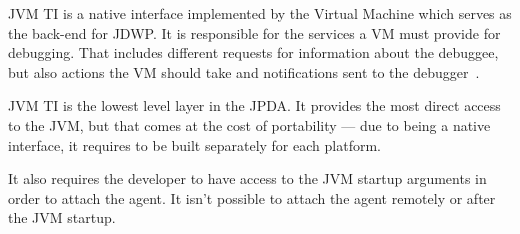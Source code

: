 \documentclass[..thesis.tex]{subfiles}
\begin{document}
JVM TI is a native interface implemented by the Virtual Machine which serves as the back-end for JDWP.
It is responsible for the services a VM must provide for debugging.
That includes different requests for information about the debuggee, but also actions the VM should take and notifications sent to the debugger~\cite{oracle_jpda_jvmti}.

JVM TI is the lowest level layer in the JPDA. 
It provides the most direct access to the JVM, but that comes at the cost of portability --- due to being a native interface, it requires to be built separately for each platform.

It also requires the developer to have access to the JVM startup arguments in order to attach the agent. It isn't possible to attach the agent remotely or after the JVM startup.
\end{document}
